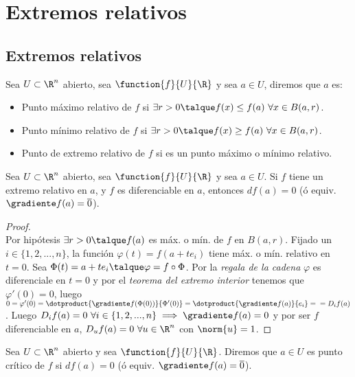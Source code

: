 \chapter{Extremos relativos}
\section{Extremos relativos}

\begin{defi}
Sea $U\subset\R^n$ abierto, sea $\function{f}{U}{\R}$ y sea $a\in U$, diremos que $a$ es:
\begin{itemize}
\item Punto máximo relativo de $f$ si $\exists r>0\talque f(x)\leq f(a)\ \forall x\in B(a,r)$.
\item Punto mínimo relativo de $f$ si $\exists r>0\talque f(x)\geq f(a)\ \forall x\in B(a,r)$.
\item Punto de extremo relativo de $f$ si es un punto máximo o mínimo relativo.
\end{itemize}
\end{defi}

\begin{proposicion} Sea $U\subset\R^n$ abierto, sea $\function{f}{U}{\R}$ y sea $a\in U$. Si $f$ tiene un extremo relativo en $a$, y $f$ es diferenciable en $a$, entonces $df(a)=0$ (ó equiv. $\gradiente f(a)=\overline{0}$).
\begin{proof}\ \\
Por hipótesis $\exists r>0\talque f(a)$ es máx. o mín. de $f$ en $B(a,r)$. Fijado un $i\in\{1,2,...,n\}$, la función $\varphi(t)=f(a+te_i)$ tiene máx. o mín. relativo en $t=0$. Sea $\Phi(t)=a+te_i\talque \varphi=f\circ\Phi$. Por la \textit{regala de la cadena} $\varphi$ es diferenciale en $t=0$ y por el \textit{teorema del extremo interior} tenemos que $\varphi'(0)=0$, luego $0=\varphi'(0)=\dotproduct{\gradiente f(\Phi(0))}{\Phi'(0)}=\dotproduct{\gradiente f(a)}{e_i}=\\
=D_if(a)$. Luego $D_i f(a)=0\ \forall i\in\{1,2,...,n\}\implies \gradiente f(a) = 0$ y por ser $f$ diferenciable en $a$, $D_uf(a)=0\ \forall u\in\R^n$ con $\norm{u}=1$.
\end{proof}
\end{proposicion}

\begin{defi} Sea $U\subset\R^n$ abierto y sea $\function{f}{U}{\R}$. Diremos que $a\in U$ es punto crítico de $f$ si $df(a)=0$ (ó equiv. $\gradiente f(a)=\overline{0}$).
\end{defi}

